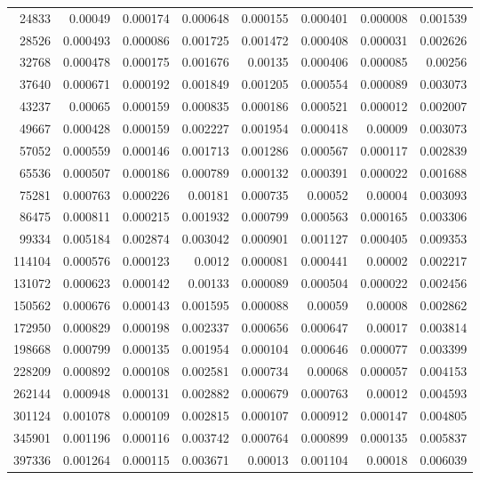 \begin{longtable}{r r r r r r r r}
24833 & 0.00049 & 0.000174 & 0.000648 & 0.000155 & 0.000401 & 0.000008 & 0.001539 \\
28526 & 0.000493 & 0.000086 & 0.001725 & 0.001472 & 0.000408 & 0.000031 & 0.002626 \\
32768 & 0.000478 & 0.000175 & 0.001676 & 0.00135 & 0.000406 & 0.000085 & 0.00256 \\
37640 & 0.000671 & 0.000192 & 0.001849 & 0.001205 & 0.000554 & 0.000089 & 0.003073 \\
43237 & 0.00065 & 0.000159 & 0.000835 & 0.000186 & 0.000521 & 0.000012 & 0.002007 \\
49667 & 0.000428 & 0.000159 & 0.002227 & 0.001954 & 0.000418 & 0.00009 & 0.003073 \\
57052 & 0.000559 & 0.000146 & 0.001713 & 0.001286 & 0.000567 & 0.000117 & 0.002839 \\
65536 & 0.000507 & 0.000186 & 0.000789 & 0.000132 & 0.000391 & 0.000022 & 0.001688 \\
75281 & 0.000763 & 0.000226 & 0.00181 & 0.000735 & 0.00052 & 0.00004 & 0.003093 \\
86475 & 0.000811 & 0.000215 & 0.001932 & 0.000799 & 0.000563 & 0.000165 & 0.003306 \\
99334 & 0.005184 & 0.002874 & 0.003042 & 0.000901 & 0.001127 & 0.000405 & 0.009353 \\
114104 & 0.000576 & 0.000123 & 0.0012 & 0.000081 & 0.000441 & 0.00002 & 0.002217 \\
131072 & 0.000623 & 0.000142 & 0.00133 & 0.000089 & 0.000504 & 0.000022 & 0.002456 \\
150562 & 0.000676 & 0.000143 & 0.001595 & 0.000088 & 0.00059 & 0.00008 & 0.002862 \\
172950 & 0.000829 & 0.000198 & 0.002337 & 0.000656 & 0.000647 & 0.00017 & 0.003814 \\
198668 & 0.000799 & 0.000135 & 0.001954 & 0.000104 & 0.000646 & 0.000077 & 0.003399 \\
228209 & 0.000892 & 0.000108 & 0.002581 & 0.000734 & 0.00068 & 0.000057 & 0.004153 \\
262144 & 0.000948 & 0.000131 & 0.002882 & 0.000679 & 0.000763 & 0.00012 & 0.004593 \\
301124 & 0.001078 & 0.000109 & 0.002815 & 0.000107 & 0.000912 & 0.000147 & 0.004805 \\
345901 & 0.001196 & 0.000116 & 0.003742 & 0.000764 & 0.000899 & 0.000135 & 0.005837 \\
397336 & 0.001264 & 0.000115 & 0.003671 & 0.00013 & 0.001104 & 0.00018 & 0.006039 \\

\end{longtable}

